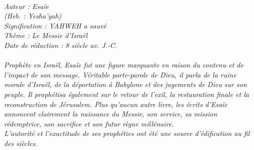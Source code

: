 \BFont
\noindent\hrulefill
{\footnotesize
\textit{
\bigskip
{\centering{}
\\Auteur : Esaïe
\\(Heb. : Yesha'yah)
\\Signification : YAHWEH a sauvé
\\Thème : Le Messie d'Israël
\\Date de rédaction : 8 siècle av. J.-C.\\}
}
\textit{
\\Prophète en Israël, Esaïe fut une figure marquante en raison du contenu et de l'impact de son message. Véritable porte-parole de Dieu, il parla de la ruine morale d'Israël, de la déportation à Babylone et des jugements de Dieu sur son peuple. Il prophétisa également sur le retour de l'exil, la restauration finale et la reconstruction de Jérusalem. Plus qu'aucun autre livre, les écrits d'Esaïe annoncent clairement la naissance du Messie, son service, sa mission rédemptrice, son sacrifice et son futur règne millénaire. 
\\L'autorité et l'exactitude de ses prophéties ont été une source d'édification au fil des siècles.\bigskip
}
}
\par\nobreak\noindent\hrulefill
